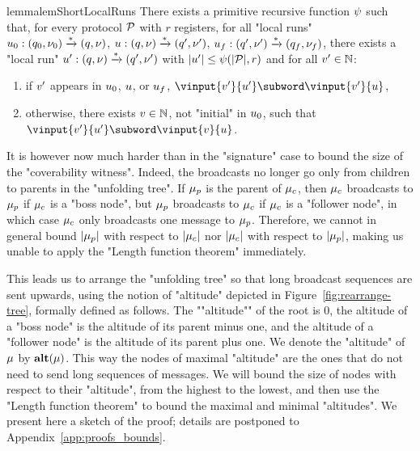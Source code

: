 	\begin{restatable}{lemma}{lemShortLocalRuns}
	\label{lem:short-local-runs}
	There exists a primitive recursive function $\psi$ such that, for every protocol $\mathcal{P}$ with $r$ registers, 
	for all "local runs" $u_0: (q_0, \nu_0) \xrightarrow{*} (q, \nu)$, $u: (q, \nu) \xrightarrow{*} (q', \nu')$, $u_f: (q', \nu') \xrightarrow{*} (q_f, \nu_f)$, there exists a "local run" $u': (q, \nu) \xrightarrow{*} (q', \nu')$ with $|u'| \leq \psi(|\mathcal{P}| ,r)$ and for all $v' \in \mathbb{N}$: 
	\begin{enumerate}
		\item if $v'$ appears in $u_0$, $u$, or $u_{f}$, $\vinput{\aval'}{\localrun'} \subword \vinput{\aval'}{\localrun}$,
		\item  otherwise, there exists $v \in \mathbb{N}$, not "initial" in $u_0$, such that $\vinput{\aval'}{\localrun'} \subword \vinput{\aval}{\localrun}$.
	\end{enumerate}
\end{restatable}

It is however now much harder than in the "signature" case to bound the size of the "coverability witness". Indeed, the broadcasts no longer go only from children to parents in the "unfolding tree". If $\mu_p$ is the parent of $\mu_c$, then $\mu_c$ broadcasts to $\mu_p$ if $\mu_c$ is a "boss node", but $\mu_p$ broadcasts to $\mu_c$ if $\mu_c$ is a "follower node", in which case $\mu_c$ only broadcasts one message to $\mu_p$. Therefore, we cannot in general bound $|\mu_p|$ with respect to $|\mu_c|$ nor $|\mu_c|$ with respect to $|\mu_p|$, making us unable to apply the "Length function theorem" immediately. 

This leads us to arrange the "unfolding tree" so that long broadcast sequences are sent upwards, using the notion of "altitude" depicted in Figure~\ref{fig:rearrange-tree}, formally defined as follows.
The ""altitude"" of the root is $0$, the altitude of a "boss node" is the altitude of its parent minus one, and the altitude of a "follower node" is the altitude of its parent plus one.
We denote the "altitude" of $\mu$ by $\mathbf{alt}(\mu)$.
This way the nodes of maximal "altitude" are the ones that do not need to send long sequences of messages. We will bound the size of nodes with respect to their "altitude", from the highest to the lowest, and then use the "Length function theorem" to bound the maximal and minimal "altitudes". We present here a sketch of the proof; details are postponed to Appendix~\ref{app:proofs_bounds}. 


